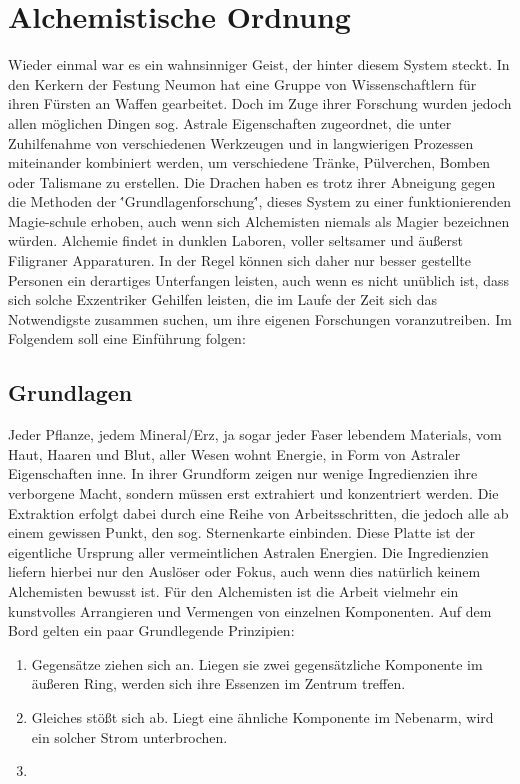 \documentclass[a4paper,12pt,oneside]{book}
\begin{document}
\section{Alchemistische Ordnung}
Wieder einmal war es ein wahnsinniger Geist, der hinter diesem System steckt. In den Kerkern der Festung Neumon hat eine Gruppe von Wissenschaftlern für ihren Fürsten an Waffen gearbeitet. Doch im Zuge ihrer Forschung wurden jedoch allen möglichen Dingen sog. Astrale Eigenschaften zugeordnet, die unter Zuhilfenahme von verschiedenen Werkzeugen und in langwierigen Prozessen miteinander kombiniert werden, um verschiedene Tränke, Pülverchen, Bomben oder Talismane zu erstellen. Die Drachen haben es trotz ihrer Abneigung gegen die Methoden der \''Grundlagenforschung\'', dieses System zu einer funktionierenden Magie-schule erhoben, auch wenn sich Alchemisten niemals als Magier bezeichnen würden. Alchemie findet in dunklen Laboren, voller seltsamer und äußerst Filigraner Apparaturen. In der Regel können sich daher nur besser gestellte Personen ein derartiges Unterfangen leisten, auch wenn es nicht unüblich ist, dass sich solche Exzentriker Gehilfen leisten, die im Laufe der Zeit sich das Notwendigste zusammen suchen, um ihre eigenen Forschungen voranzutreiben. Im Folgendem soll eine Einführung folgen:
\subsection{Grundlagen}
Jeder Pflanze, jedem Mineral/Erz, ja sogar jeder Faser lebendem Materials, vom Haut, Haaren und Blut, aller Wesen wohnt Energie, in Form von Astraler Eigenschaften inne. In ihrer Grundform zeigen nur wenige Ingredienzien ihre verborgene Macht, sondern müssen erst extrahiert und konzentriert werden. Die Extraktion erfolgt dabei durch eine Reihe von Arbeitsschritten, die jedoch alle ab einem gewissen Punkt, den sog. Sternenkarte einbinden. Diese Platte ist der eigentliche Ursprung aller vermeintlichen Astralen Energien. Die Ingredienzien liefern hierbei nur den Auslöser oder Fokus, auch wenn dies natürlich keinem Alchemisten bewusst ist. Für den Alchemisten ist die Arbeit vielmehr ein kunstvolles Arrangieren und Vermengen von einzelnen Komponenten. Auf dem Bord gelten ein paar Grundlegende Prinzipien:
\begin{enumerate}
\item Gegensätze ziehen sich an. Liegen sie zwei gegensätzliche Komponente im äußeren Ring, werden sich ihre Essenzen im Zentrum treffen.
\item Gleiches stößt sich ab. Liegt eine ähnliche Komponente im Nebenarm, wird ein solcher Strom unterbrochen.
\item 
\end{enumerate}
\end{document}

